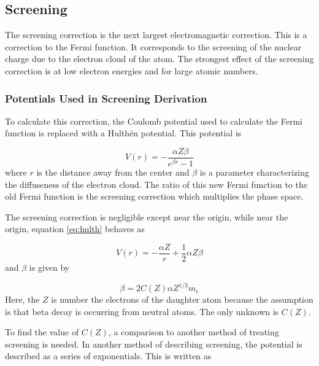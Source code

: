\documentclass[../MaxHughesThesis.tex]{subfiles}
\begin{document}
\subsection{Screening}
The screening correction is the next largest electromagnetic correction.
This is a correction to the Fermi function.
It corresponds to the screening of the nuclear charge due to the electron cloud of the atom.
The strongest effect of the screening correction is at low electron energies and for large atomic numbers.

\subsubsection{Potentials Used in Screening Derivation}
To calculate this correction, the Coulomb potential used to calculate the Fermi function is replaced with a Hulth\'en potential.
This potential is %

\begin{equation}
	V(r) = -\frac{\alpha Z \beta}{e^{\beta r} - 1}
	\label{eq:hulth}
\end{equation}
where $r$ is the distance away from the center and $\beta$ is a parameter characterizing the diffuseness of the electron cloud.
The ratio of this new Fermi function to the old Fermi function is the screening correction which multiplies the phase space. 

The screening correction is negligible except near the origin, while near the origin, equation \ref{eq:hulth} behaves as %

\begin{equation}
	V(r) = -\frac{\alpha Z}{r} + \frac{1}{2}\alpha Z \beta
	\label{eq:hulthorg}
\end{equation}
and $\beta$ is given by \cite{Buh84} %
	
\begin{equation}
	\beta = 2C(Z)\alpha Z^{1/3} m_{e}
	\label{eq:screenbeta}
\end{equation}
Here, the $Z$ is number the electrons of the daughter atom because the assumption is that beta decay is occurring from neutral atoms.
The only unknown is $C(Z)$.

To find the value of $C(Z)$, a comparison to another method of treating screening is needed.
In another method of describing screening, the potential is described as a series of exponentials.
This is written as \cite{Bya56} %
\end{document}
